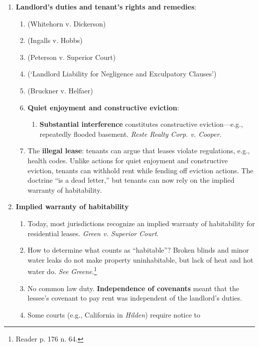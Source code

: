 \begin{enumerate}
    \item \textbf{Landlord's duties and tenant's rights and remedies}:
    \begin{enumerate}
        \item (Whitehorn v. Dickerson) %
        \item (Ingalls v. Hobbs) %
        \item (Peterson v. Superior Court) %
        \item (`Landlord Liability for Negligence and Exculpatory Clauses') 
        \item (Bruckner v. Helfaer) %
        \item \textbf{Quiet enjoyment and constructive eviction}:
        \begin{enumerate}
            \item \textbf{Substantial interference} constitutes constructive 
            eviction---e.g., repeatedly flooded basement. \emph{Reste Realty 
            Corp. v. Cooper.}
        \end{enumerate}
        \item The \textbf{illegal lease}: tenants can argue that leases 
        violate regulations, e.g., health codes. Unlike actions for quiet 
        enjoyment and constructive eviction, tenants can withhold rent while 
        fending off eviction actions. The doctrine ``is a dead letter,'' but 
        tenants can now rely on the implied warranty of habitability.
    \end{enumerate}
    \item \textbf{Implied warranty of habitability}
    \begin{enumerate}
        \item Today, most jurisdictions recognize an implied warranty of 
        habitability for residential leases. \emph{Green v. Superior Court}.
        \item How to determine what counts as ``habitable''? Broken blinds and 
        minor water leaks do not make property uninhabitable, but lack of heat 
        and hot water do. \emph{See} \emph{Greene}.\footnote{Reader p. 176 n. 
        64.}
        \item No common law duty. \textbf{Independence of covenants} meant 
        that the lessee's covenant to pay rent was independent of the 
        landlord's duties.
        \item Some courts (e.g., California in \emph{Hilden}) require notice to 

\end{enumerate}
\end{enumerate}
